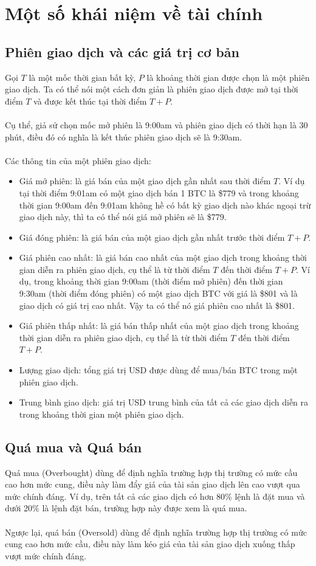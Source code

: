 \section{Một số khái niệm về tài chính}
\subsection{Phiên giao dịch và các giá trị cơ bản}
Gọi $T$ là một mốc thời gian bất kỳ, $P$ là khoảng thời gian được chọn là một 
phiên giao dịch. Ta có thể nói một cách đơn giản là phiên giao dịch được mở tại 
thời điểm $T$ và được kết thúc tại thời điểm $T + P$.\\\\
Cụ thể, giả sử chọn mốc mở phiên là 9:00am và phiên giao dịch có thời hạn là 
30 phút, điều đó có nghĩa là kết thúc phiên giao dịch sẽ là 9:30am.\\\\
Các thông tin của một phiên giao dịch:
\begin{itemize}
\item Giá mở phiên: là giá bán của một giao dịch gần nhất sau thời điểm $T$. Ví 
dụ tại thời điểm 9:01am có một giao dịch bán 1 BTC là \$779 và trong khoảng thời 
gian 9:00am đến 9:01am không hề có bất kỳ giao dịch nào khác ngoại trừ giao dịch 
này, thì ta có thể nói giá mở phiên sẽ là \$779.
\item Giá đóng phiên: là giá bán của một giao dịch gần nhất trước thời điểm 
$T + P$.
\item Giá phiên cao nhất: là giá bán cao nhất của một giao dịch trong khoảng 
thời gian diễn ra phiên giao dịch, cụ thể là từ thời điểm $T$ đến thời điểm 
$T + P$. Ví dụ, trong khoảng thời gian 9:00am (thời điểm mở phiên) đến thời gian 
9:30am (thời điểm đóng phiên) có một giao dịch BTC với giá là \$801 và là giao 
dịch có giá trị cao nhất. Vậy ta có thể nó giá phiên cao nhất là \$801.
\item Giá phiên thấp nhất: là giá bán thấp nhất của một giao dịch trong khoảng 
thời gian diễn ra phiên giao dịch, cụ thể là từ thời điểm $T$ đến thời điểm $T + P$.
\item Lượng giao dịch: tổng giá trị USD được dùng để  mua/bán BTC trong một phiên 
giao dịch.
\item Trung bình giao dịch: giá trị USD trung bình của tất cả các giao dịch diễn 
ra trong khoảng thời gian một phiên giao dịch.
\end{itemize}
\subsection{Quá mua và Quá bán}
Quá mua (Overbought) dùng để định nghĩa trường hợp thị trường có mức cầu cao hơn 
mức cung, điều này làm đẩy giá của tài sản giao dịch lên cao vượt qua mức chính 
đáng. Ví dụ, trên tất cả các giao dịch có hơn 80\% lệnh là đặt mua và dưới 20\% 
là lệnh đặt bán, trường hợp này được xem là quá mua.\\\\
Ngược lại, quá bán (Oversold) dùng để định nghĩa trường hợp thị trường có mức 
cung cao hơn mức cầu, điều này làm kéo giá của tài sản giao dịch xuống thấp vượt 
mức chính đáng.
